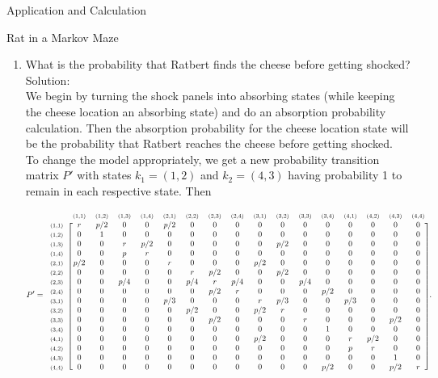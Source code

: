 \documentclass[12pt]{article}
\newcommand{\matindex}[1]{\mbox{\scriptsize#1}}
\newcommand\scalemath[2]{\scalebox{#1}{\mbox{\ensuremath{\displaystyle #2}}}}
\numberwithin{equation}{section}
\begin{document}
\begin{section}{Application and Calculation}
\begin{subsection}{Rat in a Markov Maze}
\begin{enumerate}
\item What is the probability that Ratbert finds the cheese before getting shocked?\\

Solution:\\

We begin by turning the shock panels into absorbing states (while keeping the cheese location an absorbing state) and do an absorption probability calculation. Then the absorption probability for the cheese location state will be the probability that Ratbert reaches the cheese before getting shocked.\\
To change the model appropriately, we get a new probability transition matrix $P'$ with states $k_1=(1,2)$ and $k_2=(4,3)$ having probability 1 to remain in each respective state. Then

\[\scalemath{0.75}{P'=\begin{blockarray}{ccccccccccccccccc}&\matindex{(1,1)}&\matindex{(1,2)}&\matindex{(1,3)}&\matindex{(1,4)}&\matindex{(2,1)}&\matindex{(2,2)}&\matindex{(2,3)}&\matindex{(2,4)}&\matindex{(3,1)}&\matindex{(3,2)}&\matindex{(3,3)}&\matindex{(3,4)}&\matindex{(4,1)}&\matindex{(4,2)}&\matindex{(4,3)}&\matindex{(4,4)}\\
        \begin{block}{c[cccccccccccccccc]}\matindex{(1,1)}&r&p/2&0&0&p/2&0&0&0&0&0&0&0&0&0&0&0\\
        \matindex{(1,2)}&0&1&0&0&0&0&0&0&0&0&0&0&0&0&0&0\\
        \matindex{(1,3)}&0&0&r&p/2&0&0&0&0&0&p/2&0&0&0&0&0&0\\
        \matindex{(1,4)}&0&0&p&r&0&0&0&0&0&0&0&0&0&0&0&0\\
        \matindex{(2,1)}&p/2&0&0&0&r&0&0&0&p/2&0&0&0&0&0&0&0\\
        \matindex{(2,2)}&0&0&0&0&0&r&p/2&0&0&p/2&0&0&0&0&0&0\\
        \matindex{(2,3)}&0&0&p/4&0&0&p/4&r&p/4&0&0&p/4&0&0&0&0&0\\
        \matindex{(2,4)}&0&0&0&0&0&0&p/2&r&0&0&0&p/2&0&0&0&0\\
        \matindex{(3,1)}&0&0&0&0&p/3&0&0&0&r&p/3&0&0&p/3&0&0&0\\
        \matindex{(3,2)}&0&0&0&0&0&p/2&0&0&p/2&r&0&0&0&0&0&0\\
        \matindex{(3,3)}&0&0&0&0&0&0&p/2&0&0&0&r&0&0&0&p/2&0\\
        \matindex{(3,4)}&0&0&0&0&0&0&0&0&0&0&0&1&0&0&0&0\\
        \matindex{(4,1)}&0&0&0&0&0&0&0&0&p/2&0&0&0&r&p/2&0&0\\
        \matindex{(4,2)}&0&0&0&0&0&0&0&0&0&0&0&0&p&r&0&0\\
        \matindex{(4,3)}&0&0&0&0&0&0&0&0&0&0&0&0&0&0&1&0\\
        \matindex{(4,4)}&0&0&0&0&0&0&0&0&0&0&0&p/2&0&0&p/2&r\\
        \end{block}
        \end{blockarray}.}\]


\end{enumerate}
\end{subsection}
\end{section}
\end{document}
